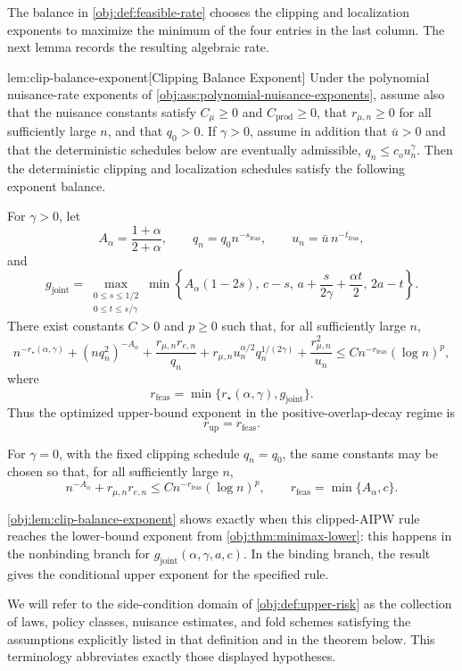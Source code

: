 The balance in \cref{obj:def:feasible-rate} chooses the clipping and localization exponents to maximize the minimum of the four entries in the last column.  The next lemma records the resulting algebraic rate.

\begin{lemmav}{lem:clip-balance-exponent}[Clipping Balance Exponent]
Under the polynomial nuisance-rate exponents of \cref{obj:ass:polynomial-nuisance-exponents}, assume also that the nuisance constants satisfy \(C_\mu\ge0\) and \(C_{\mathrm{prod}}\ge0\), that \(r_{\mu,n}\ge0\) for all sufficiently large \(n\), and that \(q_0>0\).  If \(\gamma>0\), assume in addition that \(\bar u>0\) and that the deterministic schedules below are eventually admissible, \(q_n\le c_o u_n^\gamma\).  Then the deterministic clipping and localization schedules satisfy the following exponent balance.

For \(\gamma>0\), let
\[
A_\alpha=\frac{1+\alpha}{2+\alpha},
\qquad
q_n=q_0 n^{-s_{\mathrm{feas}}},
\qquad
u_n=\bar u\, n^{-t_{\mathrm{feas}}},
\]
and
\[
g_{\mathrm{joint}}
=
\max_{\substack{0\le s\le 1/2\\ 0\le t\le s/\gamma}}
\min\left\{
A_\alpha(1-2s),\,
c-s,\,
a+\frac{s}{2\gamma}+\frac{\alpha t}{2},\,
2a-t
\right\}.
\]
There exist constants \(C>0\) and \(p\ge0\) such that, for all sufficiently large \(n\),
\[
 n^{-r_\star(\alpha,\gamma)}
 + (nq_n^2)^{-A_\alpha}
 + \frac{r_{\mu,n}r_{e,n}}{q_n}
 + r_{\mu,n}u_n^{\alpha/2}q_n^{1/(2\gamma)}
 + \frac{r_{\mu,n}^2}{u_n}
\le
C n^{-r_{\mathrm{feas}}}(\log n)^p,
\]
where
\[
r_{\mathrm{feas}}
=
\min\{r_\star(\alpha,\gamma),g_{\mathrm{joint}}\}.
\]
Thus the optimized upper-bound exponent in the positive-overlap-decay regime is
\[
r_{\mathrm{up}}=r_{\mathrm{feas}}.
\]

For \(\gamma=0\), with the fixed clipping schedule \(q_n=q_0\), the same constants may be chosen so that, for all sufficiently large \(n\),
\[
n^{-A_\alpha}+r_{\mu,n}r_{e,n}
\le
C n^{-r_{\mathrm{feas}}}(\log n)^p,
\qquad
r_{\mathrm{feas}}=\min\{A_\alpha,c\}.
\]
\end{lemmav}

\cref{obj:lem:clip-balance-exponent} shows exactly when this clipped-AIPW rule reaches the lower-bound exponent from \cref{obj:thm:minimax-lower}: this happens in the nonbinding branch for \(g_{\mathrm{joint}}(\alpha,\gamma,a,c)\).  In the binding branch, the result gives the conditional upper exponent for the specified rule.

We will refer to the side-condition domain of \cref{obj:def:upper-risk} as the collection of laws, policy classes, nuisance estimates, and fold schemes satisfying the assumptions explicitly listed in that definition and in the theorem below.  This terminology abbreviates exactly those displayed hypotheses.

